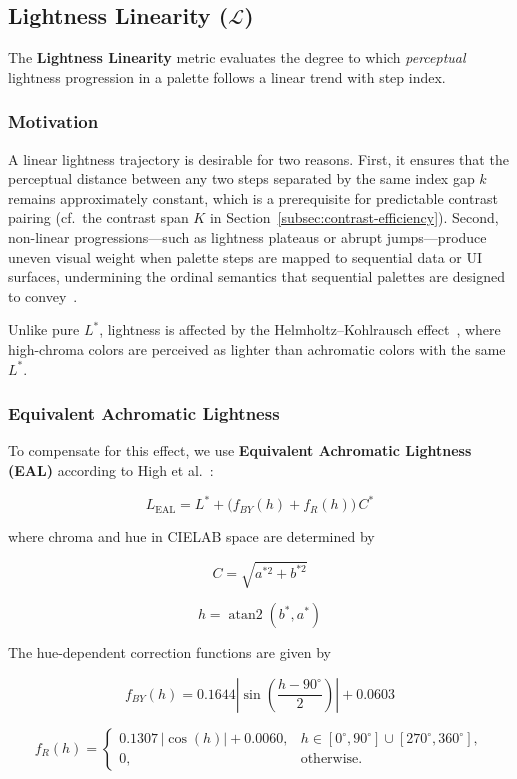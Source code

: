 \subsection{Lightness Linearity ($\mathcal{L}$)}

The \textbf{Lightness Linearity} metric evaluates the degree to which
\emph{perceptual} lightness progression in a palette follows a linear
trend with step index.

\subsubsection{Motivation}

A linear lightness trajectory is desirable for two reasons.
First, it ensures that the perceptual distance between any two steps
separated by the same index gap $k$ remains approximately constant,
which is a prerequisite for predictable contrast pairing
(cf.\ the contrast span $K$ in Section~\ref{subsec:contrast-efficiency}).
Second, non-linear progressions---such as lightness
plateaus or abrupt jumps---produce uneven visual weight when palette
steps are mapped to sequential data or UI surfaces, undermining the
ordinal semantics that sequential palettes are designed to convey~\cite{zeileis2009}.

Unlike pure $L^*$, lightness is affected by the
Helmholtz--Kohlrausch effect~\cite{high2023}, where high-chroma colors
are perceived as lighter than achromatic colors with the same $L^*$.

\subsubsection{Equivalent Achromatic Lightness}

To compensate for this effect, we use \textbf{Equivalent Achromatic
Lightness (EAL)} according to High et al.~\cite{high2023}:

\[
L_{\mathrm{EAL}} =
L^* + \bigl(f_{BY}(h) + f_R(h)\bigr)\, C^*
\]

where chroma and hue in CIELAB space are determined by

\[
C = \sqrt{a^{*2} + b^{*2}}
\]

\[
h = \operatorname{atan2}(b^*, a^*)
\]

The hue-dependent correction functions are given by

\[
f_{BY}(h) =
0.1644 \left|
\sin\!\left(\frac{h - 90^\circ}{2}\right)
\right| + 0.0603
\]

\[
f_R(h) =
\begin{cases}
0.1307 \, |\cos(h)| + 0.0060,
& h \in [0^\circ, 90^\circ] \cup [270^\circ, 360^\circ],\\
0,
& \text{otherwise}.
\end{cases}
\]

